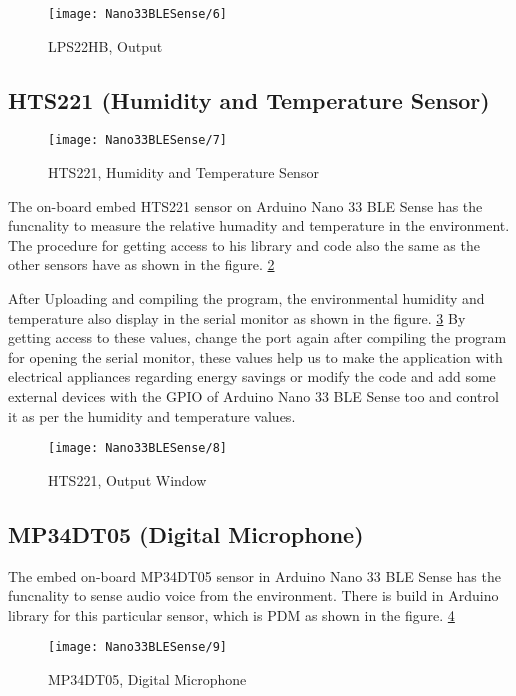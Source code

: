 \begin{figure}[htbp]
	\centering
	\texttt{[image: Nano33BLESense/6]}
	\caption{LPS22HB, Output}
	\label{fig:4}
\end{figure}

\subsection{HTS221 (Humidity and Temperature Sensor)}

\begin{figure}[htbp]
	\centering
	\texttt{[image: Nano33BLESense/7]}
	\caption{HTS221, Humidity and Temperature Sensor}
	\label{fig:5}
\end{figure}

The on-board embed HTS221 sensor on Arduino Nano 33 BLE Sense has the funcnality to measure the relative humadity and temperature in the environment. The procedure for getting access to his library and code also the same as the other sensors have as shown in the figure.  \ref{fig:5}

After Uploading and compiling the program, the environmental humidity and temperature also display in the serial monitor as shown in the figure.  \ref{fig:6} By getting access to these values, change the port again after compiling the program for opening the serial monitor, these values help us to make the application with electrical appliances regarding energy savings or modify the code and add some external devices with the GPIO of Arduino Nano 33 BLE Sense too and control it as per the humidity and temperature values.

\begin{figure}[htbp]
	\centering
	\texttt{[image: Nano33BLESense/8]}
	\caption{HTS221, Output Window}
	\label{fig:6}
\end{figure}

\subsection{MP34DT05 (Digital Microphone)}

The embed on-board MP34DT05 sensor in Arduino Nano 33 BLE Sense has the funcnality to sense audio voice from the environment. There is build in Arduino library for this particular sensor, which is PDM as shown in the figure.  \ref{fig:7}

\begin{figure}[htbp]
	\centering
	\texttt{[image: Nano33BLESense/9]}
	\caption{MP34DT05, Digital Microphone}
	\label{fig:7}
\end{figure}

